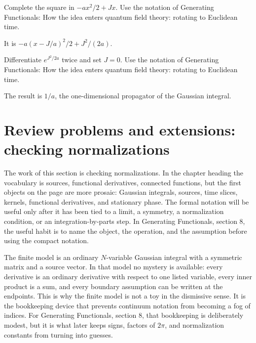 \begin{exercise}
Complete the square in \(-ax^2/2+Jx\).  Use the notation of Generating Functionals: How the idea enters quantum field theory: rotating to Euclidean time.
\begin{answer}
It is \(-a(x-J/a)^2/2+J^2/(2a)\).
\end{answer}
\end{exercise}

\begin{exercise}
Differentiate \(e^{J^2/2a}\) twice and set \(J=0\).  Use the notation of Generating Functionals: How the idea enters quantum field theory: rotating to Euclidean time.
\begin{answer}
The result is \(1/a\), the one-dimensional propagator of the Gaussian integral.
\end{answer}
\end{exercise}



\section{Review problems and extensions: checking normalizations}

The work of this section is checking normalizations.  In the chapter heading the vocabulary is sources, functional derivatives, connected functions, but the first objects on the page are more prosaic: Gaussian integrals, sources, time slices, kernels, functional derivatives, and stationary phase.  The formal notation will be useful only after it has been tied to a limit, a symmetry, a normalization condition, or an integration-by-parts step.  In Generating Functionals, section 8, the useful habit is to name the object, the operation, and the assumption before using the compact notation.

The finite model is an ordinary \(N\)-variable Gaussian integral with a symmetric matrix and a source vector.  In that model no mystery is available: every derivative is an ordinary derivative with respect to one listed variable, every inner product is a sum, and every boundary assumption can be written at the endpoints.  This is why the finite model is not a toy in the dismissive sense.  It is the bookkeeping device that prevents continuum notation from becoming a fog of indices.  For Generating Functionals, section 8, that bookkeeping is deliberately modest, but it is what later keeps signs, factors of \(2\pi\), and normalization constants from turning into guesses.

